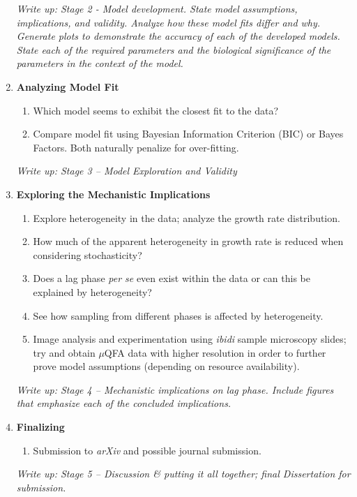 \documentclass{bioinfo}
\begin{document}
\begin{enumerate}
\textit{Write up: Stage 2 - Model development. State model assumptions, implications, and validity. Analyze how these model fits differ and why. Generate plots to demonstrate the accuracy of each of the developed models. State each of the required parameters and the biological significance of the parameters in the context of the model.} \\

\item \textbf{Analyzing Model Fit}
	\begin{enumerate}
    \item Which model seems to exhibit the closest fit to the data? 
    \item Compare model fit using Bayesian Information Criterion (BIC) or Bayes Factors. Both naturally penalize for over-fitting.
    \end{enumerate}

\textit{Write up: Stage 3 – Model Exploration and Validity} \\

\item \textbf{Exploring the Mechanistic Implications}
    \begin{enumerate}
    \item Explore heterogeneity in the data; analyze the growth rate distribution. 
    \item How much of the apparent heterogeneity in growth rate is reduced when considering stochasticity?
    \item Does a lag phase \textit{per se} even exist within the data or can this be explained by heterogeneity?
    \item See how sampling from different phases is affected by heterogeneity.
    \item Image analysis and experimentation using \textit{ibidi} sample microscopy slides; try and obtain $\mu$QFA data with higher resolution in order to further prove model assumptions (depending on resource availability).
    \end{enumerate}

\textit{Write up: Stage 4 – Mechanistic implications on lag phase. Include figures that emphasize each of the concluded implications.} \\

\item \textbf{Finalizing}
	\begin{enumerate}
    \item Submission to \textit{arXiv} and possible journal submission. 
	\end{enumerate}

\textit{Write up: Stage 5 – Discussion \& putting it all together; final Dissertation for submission.}
\end{enumerate} 
\end{document}
